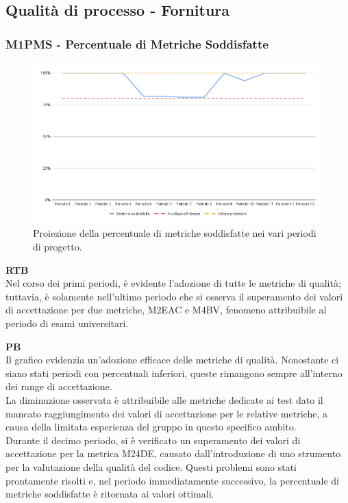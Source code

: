 \subsection{Qualità di processo - Fornitura}

\vspace{0.3cm}

\subsubsection{M1PMS - Percentuale di Metriche Soddisfatte}
\begin{figure}[H]
    \centering
    \includegraphics[width=1\textwidth]{../Images/PianoDiQualifica/M1PMS.png}
    \caption{Proiezione della percentuale di metriche soddisfatte nei vari periodi di progetto.}
    \label{fig:1}
\end{figure}

\vspace{0.2cm}

\textbf{RTB}\\
Nel corso dei primi periodi, è evidente l'adozione di tutte le metriche di qualità; tuttavia, è solamente nell'ultimo periodo che si osserva il superamento dei valori di accettazione per due metriche, M2EAC e M4BV, fenomeno attribuibile al periodo di esami universitari.

\vspace{0.3cm}

\textbf{PB} \\
Il grafico evidenzia un’adozione efficace delle metriche di qualità. Nonostante ci siano stati periodi con percentuali inferiori, queste rimangono sempre all’interno dei range di accettazione. \\
La diminuzione osservata è attribuibile alle metriche dedicate ai test dato il mancato raggiungimento dei valori di accettazione per le relative metriche, a causa della limitata esperienza del gruppo in questo specifico ambito. \\
Durante il decimo periodo, si è verificato un superamento dei valori di accettazione per la metrica M24DE, causato dall’introduzione di uno strumento per la valutazione della qualità del codice. Questi problemi sono stati prontamente risolti e, nel periodo immediatamente successivo, la percentuale di metriche soddisfatte è ritornata ai valori ottimali.

